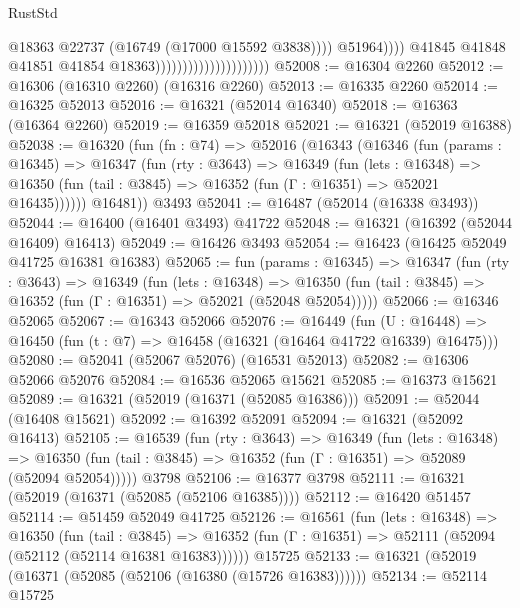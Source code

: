 \begin{lexlean}{RustStd}
\begin{coremodule}
                                                          @18363
                                                          @22737
                                                          (@16749 (@17000 @15592 @3838))))
                                                      @51964))))
                                              @41845
                                              @41848
                                              @41851
                                              @41854
                                              @18363)))))))))))))))))))))
@52008 := @16304 @2260
@52012 := @16306 (@16310 @2260) (@16316 @2260)
@52013 := @16335 @2260
@52014 := @16325 @52013
@52016 := @16321 (@52014 @16340)
@52018 := @16363 (@16364 @2260)
@52019 := @16359 @52018
@52021 := @16321 (@52019 @16388)
@52038 := @16320
    (fun (fn : @74) =>
    @52016
      (@16343
        (@16346
          (fun (params : @16345) =>
          @16347
            (fun (rty : @3643) =>
            @16349
              (fun (lets : @16348) =>
              @16350 (fun (tail : @3845) => @16352 (fun (Γ : @16351) => @52021 @16435))))))
        @16481))
    @3493
@52041 := @16487 (@52014 (@16338 @3493))
@52044 := @16400 (@16401 @3493) @41722
@52048 := @16321 (@16392 (@52044 @16409) @16413)
@52049 := @16426 @3493
@52054 := @16423 (@16425 @52049 @41725 @16381 @16383)
@52065 := fun (params : @16345) =>
  @16347
    (fun (rty : @3643) =>
    @16349
      (fun (lets : @16348) =>
      @16350 (fun (tail : @3845) => @16352 (fun (Γ : @16351) => @52021 (@52048 @52054)))))
@52066 := @16346 @52065
@52067 := @16343 @52066
@52076 := @16449
    (fun (U : @16448) => @16450 (fun (t : @7) => @16458 (@16321 (@16464 @41722 @16339) @16475)))
@52080 := @52041 (@52067 @52076) (@16531 @52013)
@52082 := @16306 @52066 @52076
@52084 := @16536 @52065 @15621
@52085 := @16373 @15621
@52089 := @16321 (@52019 (@16371 (@52085 @16386)))
@52091 := @52044 (@16408 @15621)
@52092 := @16392 @52091
@52094 := @16321 (@52092 @16413)
@52105 := @16539
    (fun (rty : @3643) =>
    @16349
      (fun (lets : @16348) =>
      @16350 (fun (tail : @3845) => @16352 (fun (Γ : @16351) => @52089 (@52094 @52054)))))
    @3798
@52106 := @16377 @3798
@52111 := @16321 (@52019 (@16371 (@52085 (@52106 @16385))))
@52112 := @16420 @51457
@52114 := @51459 @52049 @41725
@52126 := @16561
    (fun (lets : @16348) =>
    @16350
      (fun (tail : @3845) =>
      @16352 (fun (Γ : @16351) => @52111 (@52094 (@52112 (@52114 @16381 @16383))))))
    @15725
@52133 := @16321 (@52019 (@16371 (@52085 (@52106 (@16380 (@15726 @16383))))))
@52134 := @52114 @15725

\end{coremodule}
\end{lexlean}
